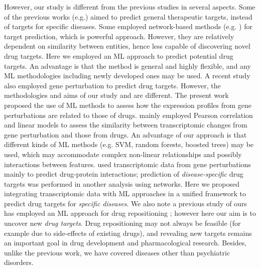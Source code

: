     However, our study is different from the previous studies in several aspects. Some of the previous works (e.g.\cite {ferrero2017silico, bakheet2009properties, kumari2015identification, li2007prediction}) aimed to predict general therapeutic targets, instead of targets for specific diseases. Some employed network-based methods (e.g. \cite{sawada2018predicting, li2015large, emig2013drug}) for target prediction, which is powerful approach. However, they are relatively dependent on similarity between entities, hence less capable of discovering novel drug targets. Here we employed an ML approach to predict potential drug targets. An advantage is that the method is general and highly flexible, and any ML methodologies including newly developed ones may be used. A recent study \cite{sawada2018predicting} also employed gene perturbation to predict drug targets. However, the methodologies and aims of our study and \cite{sawada2018predicting} are different. The present work proposed the use of ML methods to assess how the expression profiles from gene perturbations are related to those of drugs. \cite{sawada2018predicting} mainly employed Pearson correlation and linear models to assess the similarity between transcriptomic changes from gene perturbation and those from drugs. An advantage of our approach is that different kinds of ML methods (e.g. SVM, random forests, boosted trees) may be used, which may accommodate complex non-linear relationships and possibly interactions between features. \cite{sawada2018predicting} used transcriptomic data from gene perturbations mainly to predict drug-protein interactions; prediction of \textit{disease-specific} drug targets was performed in another analysis using networks. Here we proposed integrating transcriptomic data with ML approaches in a unified framework to predict drug targets for \textit{ specific diseases}. We also note a previous study of ours has employed an ML approach for drug repositioning \cite{zhao2018drug}; however here our aim is to uncover new \textit{drug targets}. Drug repositioning may not always be feasible (for example due to side-effects of existing drugs), and revealing new targets remains an important goal in drug development and pharmacological research.  Besides, unlike the previous work, we have covered diseases other than psychiatric disorders. 

